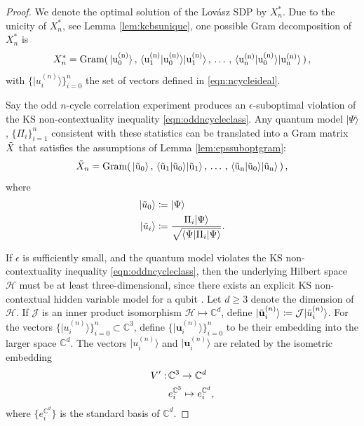 \begin{proof} We denote the optimal solution of the Lovász SDP by $X^*_n$. Due to the unicity of $X_n^*$, see Lemma \ref{lem:kcbsunique}, one possible Gram decomposition of $X^*_n$ is
\begin{equation*}
X^*_n=\operatorname{Gram(\thinspace\vert u_0^{(n)}\rangle\thinspace,\thinspace \langle u_1^{(n)}\vert u_0^{(n)} \rangle \vert u_1^{(n)}\rangle\thinspace,\thinspace \dots\thinspace,\thinspace \langle u_n^{(n)}\vert u_0^{(n)}\rangle \vert u_n^{(n)}\rangle\thinspace)}\thinspace,
\end{equation*}
with $\{\vert u_i^{(n)} \rangle \}_{i=0}^n$ the set of vectors defined in \ref{eqn:ncycleideal}.

Say the odd $n$-cycle correlation experiment produces an $\epsilon$-suboptimal violation of the KS non-contextuality inequality \ref{eqn:oddncycleclass}. Any quantum model $\vert \Psi \rangle$, $\{\Pi_i\}_{i=1}^n$ consistent with these statistics can be translated into a Gram matrix $\Tilde{X}$ that satisfies the assumptions of Lemma \ref{lem:epssuboptgram}:
\begin{equation*}
\Tilde{X}_n=\operatorname{Gram(\thinspace\vert \Tilde{u}_0\rangle\thinspace,\thinspace \langle \Tilde{u}_1\vert \Tilde{u}_0 \rangle \vert \Tilde{u}_1\rangle\thinspace,\thinspace \dots\thinspace,\thinspace \langle \Tilde{u}_n\vert \Tilde{u}_0\rangle \vert \Tilde{u}_n\rangle\thinspace)}\thinspace,
\end{equation*}
where 
\begin{align*}
    \vert \Tilde{u}_0 \rangle & \coloneqq \vert \Psi \rangle\\
    \vert  \Tilde{u}_i \rangle & \coloneqq \frac{\Pi_i \vert \Psi \rangle}{\sqrt{\langle \Psi \vert \Pi_i \vert \Psi \rangle}}.
\end{align*}

If $\epsilon$ is sufficiently small, and the quantum model violates the KS non-contextuality inequality \ref{eqn:oddncycleclass}, then the underlying Hilbert space $\mathcal{H}$ must be at least three-dimensional, since there exists an explicit KS non-contextual hidden variable model for a qubit \cite{Mermin1993}. Let $d\geq3$ denote the dimension of $\mathcal{H}$. If $\mathcal{J}$ is an inner product isomorphism $\mathcal{H}\mapsto\mathbb{C}^d$, define $\vert \Tilde{\mathbf{u}}_i^{(n)}\rangle \coloneqq \mathcal{J} \vert \Tilde{u}_i^{(n)}\rangle$.
For the vectors $\{\vert u_i^{(n)}\rangle \}_{i=0}^n\subset\mathbb{C}^3$, define $\{\vert \mathbf{u}_i^{(n)}\rangle \}_{i=0}^n$ to be their embedding into the larger space $\mathbb{C}^d$. The vectors $\vert u_i^{(n)}\rangle$ and $\vert \mathbf{u}_i^{(n)}\rangle$ are related by the isometric embedding 
\begin{align*}
    V':\thinspace & \mathbb{C}^3\rightarrow\mathbb{C}^d \\
    & e_i^{\mathbb{C}^3} \mapsto e_i^{\mathbb{C}^d},
\end{align*}
where $\{e_i^{\mathbb{C}^d}\}$ is the standard basis of $\mathbb{C}^d$.


\end{proof}
